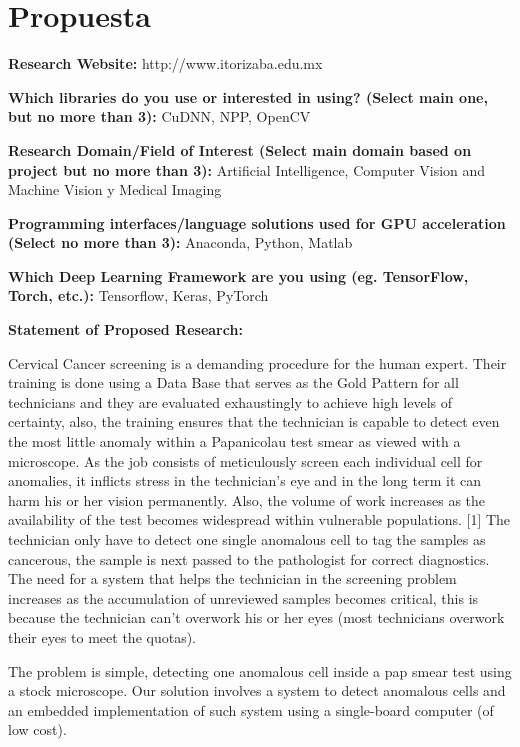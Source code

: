 \section{Propuesta}

\small

\textbf{Research Website:} http://www.itorizaba.edu.mx

\textbf{Which libraries do you use or interested in using? (Select main one, but no more than 3):} CuDNN, NPP, OpenCV

\textbf{Research Domain/Field of Interest (Select main domain based on project but no more than 3):} Artificial Intelligence, Computer Vision and Machine Vision y Medical Imaging 

\textbf{Programming interfaces/language solutions used for GPU acceleration (Select no more than 3):} Anaconda, Python, Matlab

\textbf{Which Deep Learning Framework are you using (eg. TensorFlow, Torch, etc.):} Tensorflow, Keras, PyTorch

\textbf{Statement of Proposed Research: }

Cervical Cancer screening is a demanding procedure for the human expert. Their
training is done using a Data Base that serves as the Gold Pattern for all
technicians and they are evaluated exhaustingly to achieve high levels of
certainty, also, the training ensures that the technician is capable to detect
even the most little anomaly within a Papanicolau test smear as viewed with a
microscope. As the job consists of meticulously screen each individual cell for
anomalies, it inflicts stress in the technician’s eye and in the long term it
can harm his or her vision permanently. Also, the volume of work increases as
the availability of the test becomes widespread within vulnerable populations.
[1] The technician only have to detect one single anomalous cell to tag the
samples as cancerous, the sample is next passed to the pathologist for correct
diagnostics. The need for a system that helps the technician in the screening
problem increases as the accumulation of unreviewed samples becomes critical,
this is because the technician can’t overwork his or her eyes (most technicians
overwork their eyes to meet the quotas).

The problem is simple, detecting one anomalous cell inside a pap smear test
using a stock microscope. Our solution involves a system to detect anomalous
cells and an embedded implementation of such system using a single-board
computer (of low cost). 


